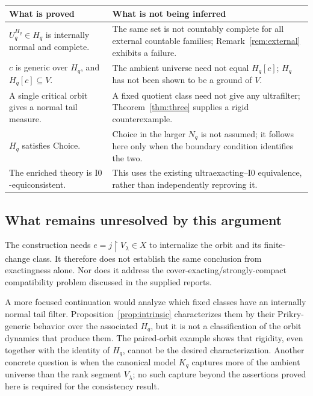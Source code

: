 \documentclass[11pt,letterpaper]{article}
\theoremstyle{definition}
\numberwithin{equation}{section}
\newcommand{\restr}{\mathbin{\upharpoonright}}
\newcommand{\Izero}{\mathrm{I0}}
\begin{document}
\begin{center}
\small
\begin{tabularx}{\textwidth}{@{}P{.30\textwidth}Y@{}}
\toprule
\textbf{What is proved} & \textbf{What is not being inferred}\\
\midrule
$U_q^{H_q}\in H_q$ is internally normal and complete.
& The same set is not countably complete for all external countable families; Remark~\ref{rem:external} exhibits a failure.\\[4pt]
$c$ is generic over $H_q$, and $H_q[c]\subseteq V$.
& The ambient universe need not equal $H_q[c]$; $H_q$ has not been shown to be a ground of $V$.\\[4pt]
A single critical orbit gives a normal tail measure.
& A fixed quotient class need not give any ultrafilter; Theorem~\ref{thm:three} supplies a rigid counterexample.\\[4pt]
$H_q$ satisfies Choice.
& Choice in the larger $N_q$ is not assumed; it follows here only when the boundary condition identifies the two.\\[4pt]
The enriched theory is $\Izero$-equiconsistent.
& This uses the existing ultraexacting--$\Izero$ equivalence, rather than independently reproving it.\\
\bottomrule
\end{tabularx}
\end{center}

\subsection{What remains unresolved by this argument}

The construction needs $e=j\restr V_\lambda\in X$ to internalize the orbit and its finite-change class. It therefore does not establish the same conclusion from exactingness alone. Nor does it address the cover-exacting/strongly-compact compatibility problem discussed in the supplied reports.

A more focused continuation would analyze which fixed classes have an internally normal tail filter. Proposition~\ref{prop:intrinsic} characterizes them by their Prikry-generic behavior over the associated $H_q$, but it is not a classification of the orbit dynamics that produce them. The paired-orbit example shows that rigidity, even together with the identity of $H_q$, cannot be the desired characterization. Another concrete question is when the canonical model $K_q$ captures more of the ambient universe than the rank segment $V_\lambda$; no such capture beyond the assertions proved here is required for the consistency result.
\end{document}
